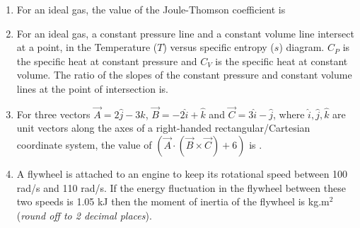 \documentclass[12pt,onecolumn]{article}
\begin{document}
\begin{enumerate}
    \item For an ideal gas, the value of the Joule-Thomson coefficient is
          \begin{enumerate}
          \end{enumerate}

    \item For an ideal gas, a constant pressure line and a constant volume line intersect at a point, in the Temperature ($T$) versus specific entropy ($s$) diagram. $C_P$ is the specific heat at constant pressure and $C_V$ is the specific heat at constant volume. The ratio of the slopes of the constant pressure and constant volume lines at the point of intersection is.
          \begin{enumerate}
          \end{enumerate}

    \item For three vectors $\vec{A} = 2\hat{j} - 3\hat{k}$, $\vec{B} = -2\hat{i} + \hat{k}$ and $\vec{C} = 3\hat{i} - \hat{j}$, where $\hat{i}, \hat{j}, \hat{k}$ are unit vectors along the axes of a right-handed rectangular/Cartesian coordinate system, the value of $\left(\vec{A}\cdot\left(\vec{B}\times\vec{C}\right)+6\right)$ is \underline{\hspace{2cm}}.

    \item A flywheel is attached to an engine to keep its rotational speed between 100 rad/s and 110 rad/s. If the energy fluctuation in the flywheel between these two speeds is 1.05 kJ then the moment of inertia of the flywheel is \underline{\hspace{2cm}} kg.m$^2$ (\textit{round off to 2 decimal places}).


\end{enumerate}
\end{document}
